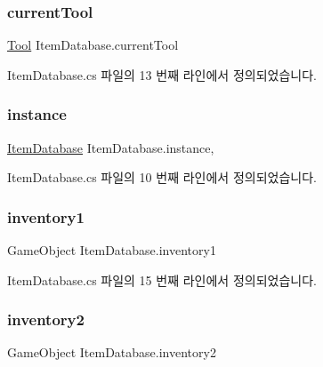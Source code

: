 \subsubsection{\texorpdfstring{currentTool}{currentTool}}
{\footnotesize\ttfamily \mbox{\hyperlink{class_tool}{Tool}} Item\+Database.\+current\+Tool}



Item\+Database.\+cs 파일의 13 번째 라인에서 정의되었습니다.

\mbox{\label{class_item_database_ae47c35933c266fb0ef04d3dfaf880b1c}} 
\subsubsection{\texorpdfstring{instance}{instance}}
{\footnotesize\ttfamily \mbox{\hyperlink{class_item_database}{Item\+Database}} Item\+Database.\+instance\hspace{0.3cm}{\ttfamily [static]}, {\ttfamily [private]}}



Item\+Database.\+cs 파일의 10 번째 라인에서 정의되었습니다.

\mbox{\label{class_item_database_a12b041c3f602e7bb9b176de5d29237d5}} 
\subsubsection{\texorpdfstring{inventory1}{inventory1}}
{\footnotesize\ttfamily Game\+Object Item\+Database.\+inventory1}



Item\+Database.\+cs 파일의 15 번째 라인에서 정의되었습니다.

\mbox{\label{class_item_database_a1cffd11f7e1826753626508420992544}} 
\subsubsection{\texorpdfstring{inventory2}{inventory2}}
{\footnotesize\ttfamily Game\+Object Item\+Database.\+inventory2}



